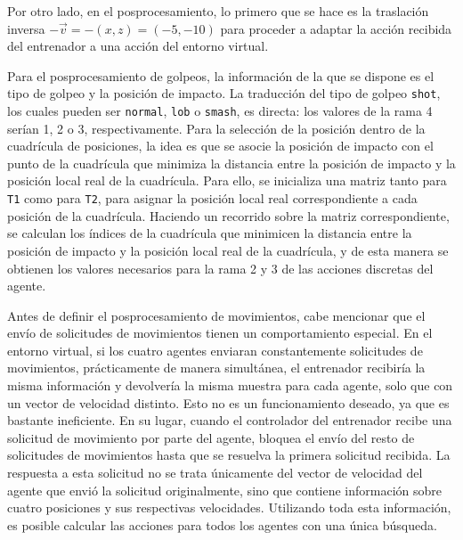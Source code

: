 \newpage

Por otro lado, en el posprocesamiento, lo primero que se hace es la traslación inversa $-\vec{v} = -(x, z) = (-5, -10)$ para proceder a adaptar la acción recibida del entrenador a una acción del entorno virtual.

Para el posprocesamiento de golpeos, la información de la que se dispone es el tipo de golpeo y la posición de impacto. La traducción del tipo de golpeo \texttt{shot}, los cuales pueden ser \texttt{normal}, \texttt{lob} o \texttt{smash}, es directa: los valores de la rama 4 serían 1, 2 o 3, respectivamente. Para la selección de la posición dentro de la cuadrícula de posiciones, la idea es que se asocie la posición de impacto con el punto de la cuadrícula que minimiza la distancia entre la posición de impacto y la posición local real de la cuadrícula. Para ello, se inicializa una matriz tanto para \texttt{T1} como para \texttt{T2}, para asignar la posición local real correspondiente a cada posición de la cuadrícula. Haciendo un recorrido sobre la matriz correspondiente, se calculan los índices de la cuadrícula que minimicen la distancia entre la posición de impacto y la posición local real de la cuadrícula, y de esta manera se obtienen los valores necesarios para la rama 2 y 3 de las acciones discretas del agente.

Antes de definir el posprocesamiento de movimientos, cabe mencionar que el envío de solicitudes de movimientos tienen un comportamiento especial. En el entorno virtual, si los cuatro agentes enviaran constantemente solicitudes de movimientos, prácticamente de manera simultánea, el entrenador recibiría la misma información y devolvería la misma muestra para cada agente, solo que con un vector de velocidad distinto. Esto no es un funcionamiento deseado, ya que es bastante ineficiente. En su lugar, cuando el controlador del entrenador recibe una solicitud de movimiento por parte del agente, bloquea el envío del resto de solicitudes de movimientos hasta que se resuelva la primera solicitud recibida. La respuesta a esta solicitud no se trata únicamente del vector de velocidad del agente que envió la solicitud originalmente, sino que contiene información sobre cuatro posiciones y sus respectivas velocidades. Utilizando toda esta información, es posible calcular las acciones para todos los agentes con una única búsqueda.

